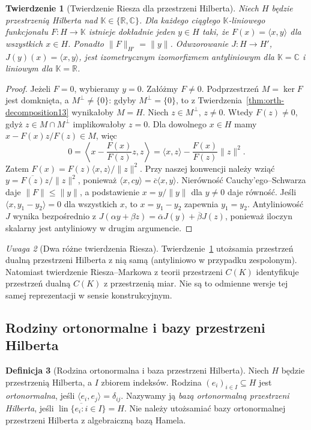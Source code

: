 \documentclass[11pt,a4paper]{article}
\numberwithin{equation}{section}
\theoremstyle{plain}
\newtheorem{twierdzenie}{Twierdzenie}[section]
\theoremstyle{definition}
\newtheorem{definicja}[twierdzenie]{Definicja}
\theoremstyle{remark}
\newtheorem{uwaga}[twierdzenie]{Uwaga}
\newcommand{\R}{\mathbb R}
\newcommand{\C}{\mathbb C}
\newcommand{\K}{\mathbb K}
\DeclareMathOperator{\lin}{lin}
\begin{document}
\begin{twierdzenie}[Twierdzenie Riesza dla przestrzeni Hilberta]
\label{thm:riesz-hilbert13}
Niech $H$ będzie przestrzenią Hilberta nad $\K\in\{\R,\C\}$.
Dla każdego ciągłego $\K$-liniowego funkcjonału $F:H\to\K$
istnieje dokładnie jeden $y\in H$ taki, że
$F(x)=\langle x,y\rangle$ dla wszystkich $x\in H$.
Ponadto $\|F\|_{H'}=\|y\|$.
Odwzorowanie $J:H\to H'$, $J(y)(x)=\langle x,y\rangle$,
jest izometrycznym izomorfizmem \emph{antyliniowym} dla $\K=\C$
i liniowym dla $\K=\R$.
\end{twierdzenie}
\begin{proof}
Jeżeli $F=0$, wybieramy $y=0$. Załóżmy $F\ne0$.
Podprzestrzeń $M=\ker F$ jest domknięta, a $M^\perp\ne\{0\}$:
gdyby $M^\perp=\{0\}$, to z Twierdzenia~\ref{thm:orth-decomposition13}
wynikałoby $M=H$.
Niech $z\in M^\perp$, $z\ne0$. Wtedy $F(z)\ne0$, gdyż
$z\in M\cap M^\perp$ implikowałoby $z=0$.
Dla dowolnego $x\in H$ mamy
$x-F(x)z/F(z)\in M$, więc
\[
0=\left\langle x-\frac{F(x)}{F(z)}z,z\right\rangle
=\langle x,z\rangle-\frac{F(x)}{F(z)}\|z\|^2.
\]
Zatem $F(x)=F(z)\langle x,z\rangle/\|z\|^2$.
Przy naszej konwencji należy wziąć
$y=\overline{F(z)}z/\|z\|^2$, ponieważ
$\langle x,cy\rangle=\overline c\langle x,y\rangle$.
Nierówność Cauchy'ego--Schwarza daje $\|F\|\le\|y\|$,
a podstawienie $x=y/\|y\|$ dla $y\ne0$ daje równość.
Jeśli $\langle x,y_1-y_2\rangle=0$ dla wszystkich $x$, to
$x=y_1-y_2$ zapewnia $y_1=y_2$. Antyliniowość $J$
wynika bezpośrednio z $J(\alpha y+\beta z)
=\overline\alpha J(y)+\overline\beta J(z)$, ponieważ
iloczyn skalarny jest antyliniowy w drugim argumencie.
\end{proof}

\begin{uwaga}[Dwa różne twierdzenia Riesza]
\label{rem:two-riesz13}
Twierdzenie~\ref{thm:riesz-hilbert13} utożsamia przestrzeń dualną
przestrzeni Hilberta z nią samą (antyliniowo w przypadku zespolonym).
Natomiast twierdzenie Riesza--Markowa z teorii przestrzeni $C(K)$ identyfikuje
przestrzeń dualną $C(K)$ z przestrzenią miar. Nie są to
odmienne wersje tej samej reprezentacji w sensie konstrukcyjnym.
\end{uwaga}

\subsection{Rodziny ortonormalne i bazy przestrzeni Hilberta}

\begin{definicja}[Rodzina ortonormalna i baza przestrzeni Hilberta]
\label{def:on-basis13}
Niech $H$ będzie przestrzenią Hilberta, a $I$ zbiorem indeksów.
Rodzina $(e_i)_{i\in I}\subseteq H$ jest \emph{ortonormalna}, jeśli
$\langle e_i,e_j\rangle=\delta_{ij}$.
Nazywamy ją \emph{bazą ortonormalną przestrzeni Hilberta}, jeśli
$\overline{\lin\{e_i:i\in I\}}=H$.
Nie należy utożsamiać bazy ortonormalnej przestrzeni Hilberta z algebraiczną bazą Hamela.
\end{definicja}
\end{document}
